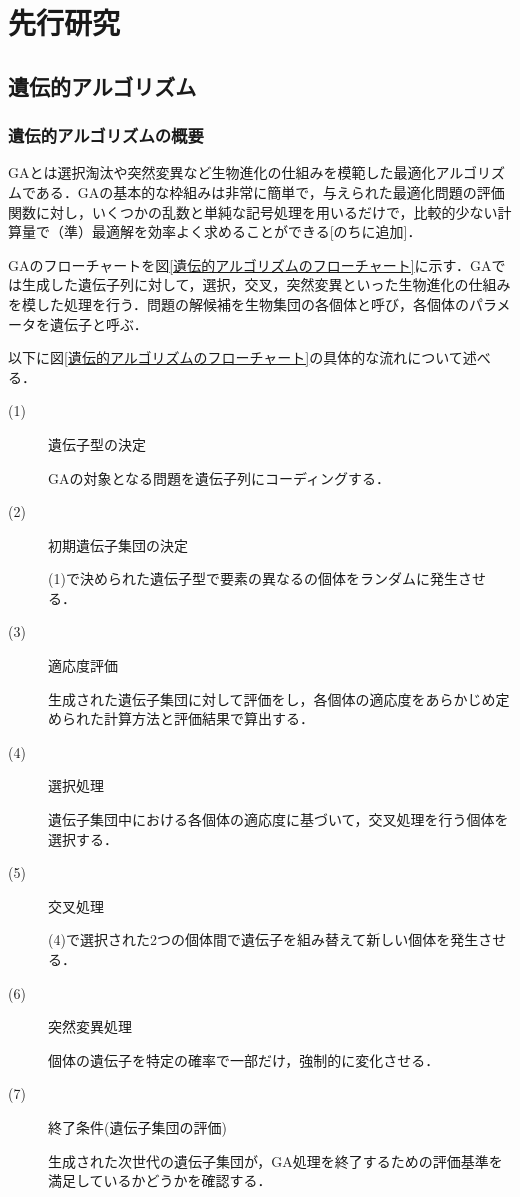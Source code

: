 \chapter{先行研究}
\thispagestyle{fancy} %
\lhead{}
\chead{}
\rhead{}
\lfoot{} 
\cfoot{\thepage}  
\rfoot{}
%

\section{遺伝的アルゴリズム}
\label{sec2.1}

\subsection{遺伝的アルゴリズムの概要}
\label{sec2.1.1}

GAとは選択淘汰や突然変異など生物進化の仕組みを模範した最適化アルゴリズムである\cite{GA}．GAの基本的な枠組みは非常に簡単で，与えられた最適化問題の評価関数に対し，いくつかの乱数と単純な記号処理を用いるだけで，比較的少ない計算量で（準）最適解を効率よく求めることができる[のちに追加]．

GAのフローチャートを図\ref{遺伝的アルゴリズムのフローチャート}に示す．GAでは生成した遺伝子列に対して，選択，交叉，突然変異といった生物進化の仕組みを模した処理を行う．問題の解候補を生物集団の各個体と呼び，各個体のパラメータを遺伝子と呼ぶ．

以下に図\ref{遺伝的アルゴリズムのフローチャート}の具体的な流れについて述べる．


\begin{description}
\item[ (1) ]遺伝子型の決定

GAの対象となる問題を遺伝子列にコーディングする．

\item[ (2) ]初期遺伝子集団の決定

(1)で決められた遺伝子型で要素の異なるの個体をランダムに発生させる．

\item[ (3) ]適応度評価

生成された遺伝子集団に対して評価をし，各個体の適応度をあらかじめ定められた計算方法と評価結果で算出する．

\item[ (4) ]選択処理

遺伝子集団中における各個体の適応度に基づいて，交叉処理を行う個体を選択する．

\item[ (5) ]交叉処理

(4)で選択された2つの個体間で遺伝子を組み替えて新しい個体を発生させる．

\item[ (6) ]突然変異処理

個体の遺伝子を特定の確率で一部だけ，強制的に変化させる．

\item[ (7) ]終了条件(遺伝子集団の評価)

生成された次世代の遺伝子集団が，GA処理を終了するための評価基準を満足しているかどうかを確認する．
\end{description}

